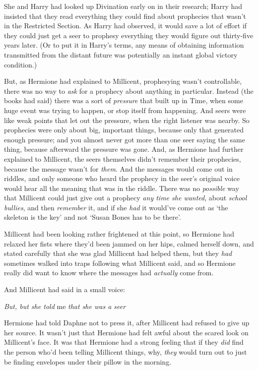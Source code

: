 She and Harry had looked up Divination early on in their research; Harry had
insisted that they read everything they could find about prophecies that wasn't
in the Restricted Section. As Harry had observed, it would save a lot of effort
if they could just get a seer to prophesy everything they would figure out
thirty-five years later. (Or to put it in Harry's terms, any means of obtaining
information transmitted from the distant future was potentially an instant
global victory condition.)

But, as Hermione had explained to Millicent, prophesying wasn't controllable,
there was no way to \emph{ask} for a prophecy about anything in particular.
Instead (the books had said) there was a sort of \emph{pressure} that built up
in Time, when some huge event was trying to happen, or stop itself from
happening. And seers were like weak points that let out the pressure, when the
right listener was nearby. So prophecies were only about big, important things,
because only that generated enough pressure; and you almost never got more than
one seer saying the same thing, because afterward the pressure was gone. And,
as Hermione had further explained to Millicent, the seers themselves didn't
remember their prophecies, because the message wasn't for \emph{them}. And the
messages would come out in riddles, and only someone who heard the prophecy in
the seer's original voice would hear all the meaning that was in the riddle.
There was no \emph{possible} way that Millicent could just give out a prophecy
\emph{any time she wanted}, about \emph{school bullies}, and then
\emph{remember} it, and if she \emph{had} it would've come out as `the skeleton
is the key' and not `Susan Bones has to be there'.

Millicent had been looking rather frightened at this point, so Hermione had
relaxed her fists where they'd been jammed on her hips, calmed herself down,
and stated carefully that she was glad Millicent had helped them, but they
\emph{had} sometimes walked into traps following what Millicent said, and so
Hermione really did want to know where the messages had \emph{actually} come
from.

And Millicent had said in a small voice:

\emph{But, but she told} me \emph{that she was a seer{\el}}

Hermione had told Daphne not to press it, after Millicent had refused to give
up her source. It wasn't just that Hermione had felt awful about the scared
look on Millicent's face. It was that Hermione had a strong feeling that if
they \emph{did} find the person who'd been telling Millicent things, why,
\emph{they} would turn out to just be finding envelopes under their pillow in
the morning.

